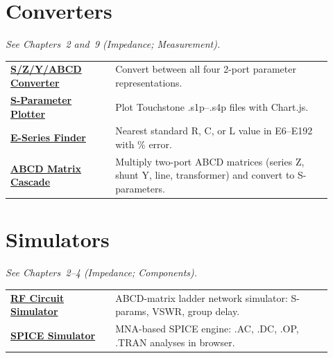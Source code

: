 \section*{Converters}
\noindent\emph{See Chapters~2 and~9 (Impedance; Measurement).}
\begin{longtable}{>{\raggedright\arraybackslash}p{0.30\linewidth}>{\raggedright\arraybackslash}p{0.62\linewidth}}
\hline
\href{https://rftoolbox.ca/TwoPortConverter.html}{\textbf{S/Z/Y/ABCD Converter}} & Convert between all four 2-port parameter representations. \\
\href{https://rftoolbox.ca/SParamPlotter.html}{\textbf{S-Parameter Plotter}} & Plot Touchstone .s1p–.s4p files with Chart.js. \\
\href{https://rftoolbox.ca/ESeries.html}{\textbf{E-Series Finder}} & Nearest standard R, C, or L value in E6–E192 with \% error. \\
\href{https://rftoolbox.ca/ABCDCascade.html}{\textbf{ABCD Matrix Cascade}} & Multiply two-port ABCD matrices (series Z, shunt Y, line, transformer) and convert to S-parameters. \\
\hline
\end{longtable}

\section*{Simulators}
\noindent\emph{See Chapters~2--4 (Impedance; Components).}
\begin{longtable}{>{\raggedright\arraybackslash}p{0.30\linewidth}>{\raggedright\arraybackslash}p{0.62\linewidth}}
\hline
\href{https://rftoolbox.ca/RFSimulator.html}{\textbf{RF Circuit Simulator}} & ABCD-matrix ladder network simulator: S-params, VSWR, group delay. \\
\href{https://rftoolbox.ca/SpiceSim.html}{\textbf{SPICE Simulator}} & MNA-based SPICE engine: .AC, .DC, .OP, .TRAN analyses in browser. \\
\hline
\end{longtable}

